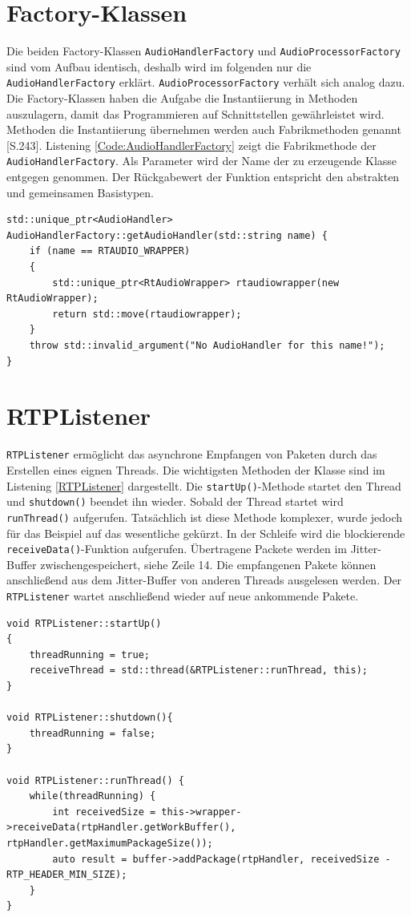 \section{Factory-Klassen}
Die beiden Factory-Klassen \texttt{AudioHandlerFactory} und \texttt{AudioProcessorFactory} sind vom Aufbau identisch, deshalb wird im folgenden nur die \texttt{AudioHandlerFactory} erklärt. \texttt{AudioProcessorFactory} verhält sich analog dazu. Die Factory-Klassen haben die Aufgabe die Instantiierung in Methoden auszulagern, damit das Programmieren auf Schnittstellen gewährleistet wird. Methoden die Instantiierung übernehmen werden auch Fabrikmethoden genannt \cite{Goll2013}[S.243]. Listening \ref{Code:AudioHandlerFactory} zeigt die Fabrikmethode der \texttt{AudioHandlerFactory}. Als Parameter wird der Name der zu erzeugende Klasse entgegen genommen. Der Rückgabewert der Funktion entspricht den abstrakten und gemeinsamen Basistypen.

\begin{lstlisting}[caption={Fabrikmethode der AudioHandlerFactory},label={Code:AudioHandlerFactory}]
std::unique_ptr<AudioHandler> AudioHandlerFactory::getAudioHandler(std::string name) {
	if (name == RTAUDIO_WRAPPER)
	{
		std::unique_ptr<RtAudioWrapper> rtaudiowrapper(new RtAudioWrapper);
		return std::move(rtaudiowrapper);
	}
	throw std::invalid_argument("No AudioHandler for this name!");
}
\end{lstlisting}

\section{RTPListener}
\texttt{RTPListener} ermöglicht das asynchrone Empfangen von Paketen durch das Erstellen eines eignen Threads. Die wichtigsten Methoden der Klasse sind im Listening \ref{RTPListener} dargestellt. Die \texttt{startUp()}-Methode startet den Thread und \texttt{shutdown()} beendet ihn wieder. Sobald der Thread startet wird \texttt{runThread()} aufgerufen. Tatsächlich ist diese Methode komplexer, wurde jedoch für das Beispiel auf das wesentliche gekürzt. In der Schleife wird die blockierende \texttt{receiveData()}-Funktion aufgerufen. Übertragene Packete werden im Jitter-Buffer zwischengespeichert, siehe Zeile 14. Die empfangenen Pakete können anschließend aus dem Jitter-Buffer von anderen Threads ausgelesen werden. Der \texttt{RTPListener} wartet anschließend wieder auf neue ankommende Pakete.

\begin{lstlisting}[caption={Die wichtigsten Methoden des RTPListeners},label={Code:RTPListener}]
void RTPListener::startUp()
{
    threadRunning = true;
    receiveThread = std::thread(&RTPListener::runThread, this);
}

void RTPListener::shutdown(){
	threadRunning = false;
}

void RTPListener::runThread() {
	while(threadRunning) {
		int receivedSize = this->wrapper->receiveData(rtpHandler.getWorkBuffer(), rtpHandler.getMaximumPackageSize());
		auto result = buffer->addPackage(rtpHandler, receivedSize - RTP_HEADER_MIN_SIZE);
	}
}
\end{lstlisting}

